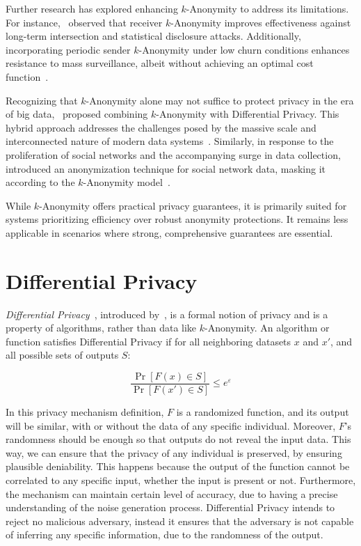 Further research has explored enhancing \(k\)-Anonymity to address its limitations. For instance,~\citeauthor{kAnonymityEffectiveness} observed that receiver \(k\)-Anonymity improves effectiveness against long-term intersection and statistical disclosure attacks. Additionally, incorporating periodic sender \(k\)-Anonymity under low churn conditions enhances resistance to mass surveillance, albeit without achieving an optimal cost function~\cite{kAnonymityEffectiveness}.

Recognizing that \(k\)-Anonymity alone may not suffice to protect privacy in the era of big data,~\citeauthor{BigdataKAnon} proposed combining \(k\)-Anonymity with Differential Privacy. This hybrid approach addresses the challenges posed by the massive scale and interconnected nature of modern data systems~\cite{BigdataKAnon}. Similarly, in response to the proliferation of social networks and the accompanying surge in data collection,~\citeauthor{CAMPAN} introduced an anonymization technique for social network data, masking it according to the \(k\)-Anonymity model~\cite{CAMPAN}.

While \(k\)-Anonymity offers practical privacy guarantees, it is primarily suited for systems prioritizing efficiency over robust anonymity protections. It remains less applicable in scenarios where strong, comprehensive guarantees are essential.


\section{Differential Privacy}\label{sec:differential_privacy}

\textit{Differential Privacy}~\cite*{DifPrivacy, DifPrivacyCalNoise, DP_Book}, introduced by~\citeauthor{DifPrivacyCalNoise}, is a formal notion of privacy and is a property of algorithms, rather than data like \(k\)-Anonymity. An algorithm or function satisfies Differential Privacy if for all neighboring datasets \(x\) and \(x'\), and all possible sets of outputs \(S\):

\begin{equation}\label{eq:dp_privacy_mechanism}
    \frac{\Pr[F(x) \in S]}{\Pr[F(x') \in S]} \leq e^{\varepsilon}
\end{equation}

In this privacy mechanism definition, \(F\) is a randomized function, and its output will be similar, with or without the data of any specific individual. Moreover, \(F\)'s randomness should be enough so that outputs do not reveal the input data. This way, we can ensure that the privacy of any individual is preserved, by ensuring plausible deniability. This happens because the output of the function cannot be correlated to any specific input, whether the input is present or not. Furthermore, the mechanism can maintain certain level of accuracy, due to having a precise understanding of the noise generation process. Differential Privacy intends to reject no malicious adversary, instead it ensures that the adversary is not capable of inferring any specific information, due to the randomness of the output.

